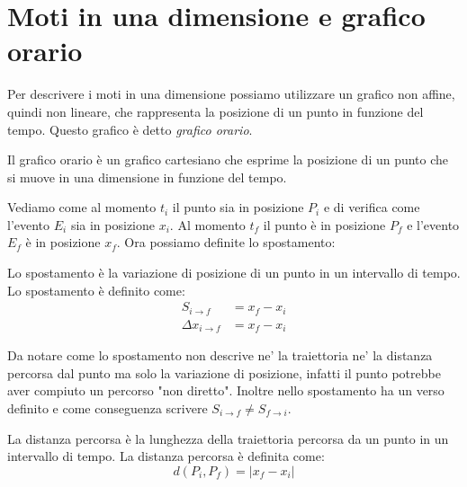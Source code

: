 \section{Moti in una dimensione e grafico orario}
    Per descrivere i moti in una dimensione possiamo utilizzare un grafico non affine, quindi non lineare, che rappresenta la posizione di un punto in funzione del tempo. Questo grafico è detto \textit{grafico orario}.
    \begin{definition}
        Il grafico orario è un grafico cartesiano che esprime la posizione di un punto che si muove in una dimensione in funzione del tempo.
    \end{definition}
    Vediamo come al momento $t_i$ il punto sia in posizione $P_i$ e di verifica come l'evento $E_i$ sia in posizione $x_i$. Al momento $t_f$ il punto è in posizione $P_f$ e l'evento $E_f$ è in posizione $x_f$. Ora possiamo definite lo spostamento:
    \begin{definition}[Spostamento]
        Lo spostamento è la variazione di posizione di un punto in un intervallo di tempo. Lo spostamento è definito come:
        $$
            \begin{aligned}
                S_{i \to f} &= x_f - x_i\\
                \Delta x_{i \to f} &= x_f - x_i
            \end{aligned}
        $$
    \end{definition}
    Da notare come lo spostamento non descrive ne' la traiettoria ne' la distanza percorsa dal punto ma solo la variazione di posizione, infatti il punto potrebbe aver compiuto un percorso "non diretto". Inoltre nello spostamento ha un verso definito e come conseguenza scrivere $S_{i \to f} \neq S_{f \to i}$.
    \begin{definition}
        La distanza percorsa è la lunghezza della traiettoria percorsa da un punto in un intervallo di tempo. La distanza percorsa è definita come:
        $$
            d(P_i, P_f) = \left| x_f - x_i \right|
        $$
    \end{definition}
